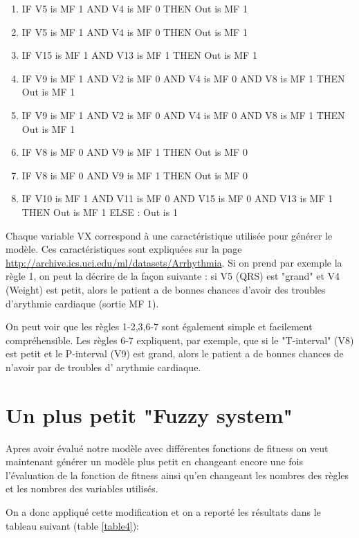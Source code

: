 \begin{enumerate}
  \item IF V5 is MF 1 AND V4 is MF 0 THEN Out is MF 1
  \item IF V5 is MF 1 AND V4 is MF 0 THEN Out is MF 1
  \item IF V15 is MF 1 AND V13 is MF 1 THEN Out is MF 1
  \item IF V9 is MF 1 AND V2 is MF 0 AND V4 is MF 0 AND V8 is MF 1 THEN Out is MF 1
  \item IF V9 is MF 1 AND V2 is MF 0 AND V4 is MF 0 AND V8 is MF 1 THEN Out is MF 1
  \item IF V8 is MF 0 AND V9 is MF 1 THEN Out is MF 0
  \item IF V8 is MF 0 AND V9 is MF 1 THEN Out is MF 0
  \item IF V10 is MF 1 AND V11 is MF 0 AND V15 is MF 0 AND V13 is MF 1 THEN Out is MF 1 ELSE : Out is 1  
\end{enumerate}

Chaque variable VX correspond à une caractéristique utilisée pour générer le modèle. Ces caractéristiques sont expliquées sur la page \url{http://archive.ics.uci.edu/ml/datasets/Arrhythmia}.
Si on prend par exemple la règle 1, on peut la décrire de la façon suivante : si V5 (QRS) est "grand" et V4 (Weight) est petit, alors le patient a de bonnes chances d'avoir des troubles d'arythmie cardiaque (sortie MF 1).

On peut voir que les règles 1-2,3,6-7 sont également simple et facilement compréhensible. 
Les règles 6-7 expliquent, par exemple, que si le "T-interval" (V8) est petit et le P-interval (V9) est grand, alors le patient a de bonnes chances de n'avoir par de troubles d' arythmie cardiaque.


\section*{Un plus petit "Fuzzy system"}

Apres avoir évalué notre modèle avec différentes fonctions de fitness on veut maintenant générer un modèle plus petit en changeant encore une fois l'évaluation de la fonction de fitness ainsi qu'en changeant les nombres des règles et les nombres des variables utilisés.

On a donc appliqué cette modification et on a reporté les résultats dans le tableau suivant (table \ref{table4}):
 
